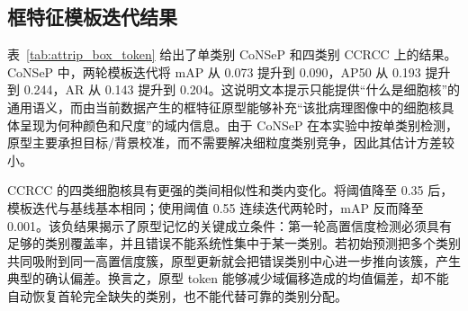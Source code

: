\begin{table}[t]
\caption{学生网络结构对比}
\label{tab:attrip_architecture}
\begin{center}
\end{center}
\vskip -0.15in
\end{table}

\subsection{框特征模板迭代结果}
表~\ref{tab:attrip_box_token} 给出了单类别 CoNSeP 和四类别 CCRCC 上的结果。CoNSeP 中，两轮模板迭代将 mAP 从 0.073 提升到 0.090，AP50 从 0.193 提升到 0.244，AR 从 0.143 提升到 0.204。这说明文本提示只能提供“什么是细胞核”的通用语义，而由当前数据产生的框特征原型能够补充“该批病理图像中的细胞核具体呈现为何种颜色和尺度”的域内信息。由于 CoNSeP 在本实验中按单类别检测，原型主要承担目标/背景校准，而不需要解决细粒度类别竞争，因此其估计方差较小。

CCRCC 的四类细胞核具有更强的类间相似性和类内变化。将阈值降至 0.35 后，模板迭代与基线基本相同；使用阈值 0.55 连续迭代两轮时，mAP 反而降至 0.001。该负结果揭示了原型记忆的关键成立条件：第一轮高置信度检测必须具有足够的类别覆盖率，并且错误不能系统性集中于某一类别。若初始预测把多个类别共同吸附到同一高置信度簇，原型更新就会把错误类别中心进一步推向该簇，产生典型的确认偏差。换言之，原型 token 能够减少域偏移造成的均值偏差，却不能自动恢复首轮完全缺失的类别，也不能代替可靠的类别分配。


